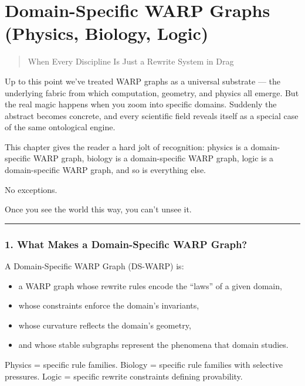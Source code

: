 \chapter{Domain-Specific WARP Graphs (Physics, Biology,
Logic)}\label{domain-specific-rmgs-physics-biology-logic}

\begin{quote}
When Every Discipline Is Just a Rewrite System in Drag
\end{quote}

Up to this point we've treated WARP graphs as a universal substrate --- the
underlying fabric from which computation, geometry, and physics all
emerge. But the real magic happens when you zoom into specific domains.
Suddenly the abstract becomes concrete, and every scientific field
reveals itself as a special case of the same ontological engine.

This chapter gives the reader a hard jolt of recognition: physics is a
domain-specific WARP graph, biology is a domain-specific WARP graph, logic is a
domain-specific WARP graph, and so is everything else.

No exceptions.

Once you see the world this way, you can't unsee it.

\begin{center}\rule{0.5\linewidth}{0.5pt}\end{center}

\subsection{1. What Makes a Domain-Specific
WARP Graph?}\label{what-makes-a-domain-specific-rmg}

A Domain-Specific WARP Graph (DS-WARP) is:

\begin{itemize}
\tightlist
\item
  a WARP graph whose rewrite rules encode the ``laws'' of a given domain,
\item
  whose constraints enforce the domain's invariants,
\item
  whose curvature reflects the domain's geometry,
\item
  and whose stable subgraphs represent the phenomena that domain
  studies.
\end{itemize}

Physics = specific rule families. Biology = specific rule families with
selective pressures. Logic = specific rewrite constraints defining
provability.

